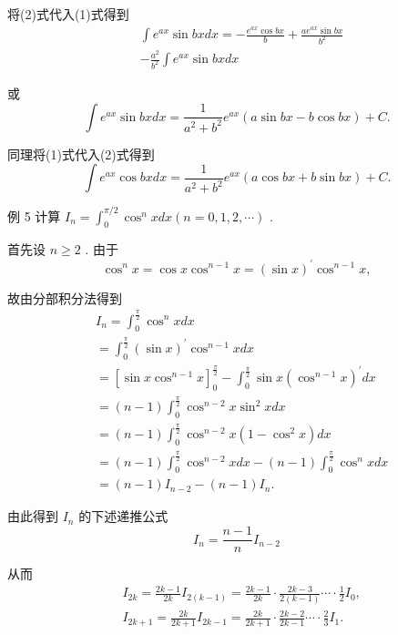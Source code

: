 将(2)式代入(1)式得到
\begin{align*}
	&\int {e}^{ax}\sin {bx}{dx} =  - \frac{{e}^{ax}\cos {bx}}{b} + \frac{a{e}^{ax}\sin {bx}}{{b}^{2}}\\
	&- \frac{{a}^{2}}{{b}^{2}}\int {e}^{ax}\sin {bxdx}
\end{align*}

或
$$\int {e}^{ax}\sin {bxdx} = \frac{1}{{a}^{2} + {b}^{2}}{e}^{ax}\left( {a\sin {bx} - b\cos {bx}}\right)  + C.$$

同理将(1)式代入(2)式得到
$$\int {e}^{ax}\cos {bxdx} = \frac{1}{{a}^{2} + {b}^{2}}{e}^{ax}\left( {a\cos {bx} + b\sin {bx}}\right)  + C.$$

例 5 计算 ${I}_{n} = {\int }_{0}^{\pi /2}{\cos }^{n}{xdx}\left( {n = 0,1,2,\cdots }\right)$ .

首先设 $n \geq  2$ . 由于
$${\cos }^{n}x = \cos x{\cos }^{n - 1}x = {\left( \sin x\right) }^{\prime }{\cos }^{n - 1}x,$$

故由分部积分法得到
\begin{align*}
	&{I}_{n} = {\int }_{0}^{\frac{\pi }{2}}{\cos }^{n}{xdx}\\
	&= {\int }_{0}^{\frac{\pi }{2}}{\left( \sin x\right) }^{\prime }{\cos }^{n - 1}{xdx}\\
	&= {\left\lbrack  \sin x{\cos }^{n - 1}x\right\rbrack  }_{0}^{\frac{\pi }{2}} - {\int }_{0}^{\frac{\pi }{2}}\sin x{\left( {\cos }^{n - 1}x\right) }^{\prime }{dx}\\
	&= \left( {n - 1}\right) {\int }_{0}^{\frac{\pi }{2}}{\cos }^{n - 2}x{\sin }^{2}{xdx}\\
	&= \left( {n - 1}\right) {\int }_{0}^{\frac{\pi }{2}}{\cos }^{n - 2}x\left( {1 - {\cos }^{2}x}\right) {dx}\\
	&= \left( {n - 1}\right) {\int }_{0}^{\frac{\pi }{2}}{\cos }^{n - 2}{xdx} - \left( {n - 1}\right) {\int }_{0}^{\frac{\pi }{2}}{\cos }^{n}{xdx}\\
	&= \left( {n - 1}\right) {I}_{n - 2} - \left( {n - 1}\right) {I}_{n}.
\end{align*}

由此得到 ${I}_{n}$ 的下述递推公式
$${I}_{n} = \frac{n - 1}{n}{I}_{n - 2}$$

从而
\begin{align*}
	&{I}_{2k} = \frac{{2k} - 1}{2k}{I}_{2\left( {k - 1}\right) } = \frac{{2k} - 1}{2k} \cdot  \frac{{2k} - 3}{2\left( {k - 1}\right) }\cdots  \cdot  \frac{1}{2}{I}_{0},\\
	&{I}_{{2k} + 1} = \frac{2k}{{2k} + 1}{I}_{{2k} - 1} = \frac{2k}{{2k} + 1} \cdot  \frac{{2k} - 2}{{2k} - 1}\cdots  \cdot  \frac{2}{3}{I}_{1}.
\end{align*}

